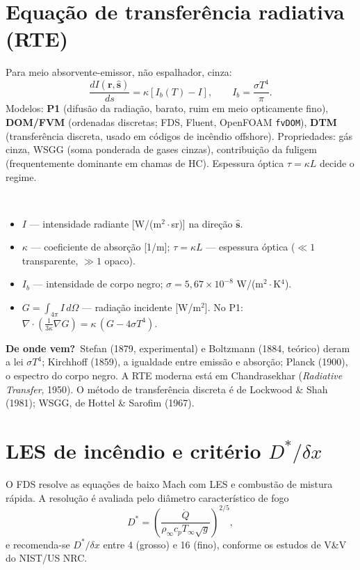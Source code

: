 \documentclass[10pt,a4paper,twocolumn,openany]{report}
\newcommand{\lead}[2]{\par\medskip\noindent{\color{#1}\bfseries #2}\ }
\newenvironment{conceito}[1]{\section{#1}}{\par}
\newenvironment{dicionario}[1][Dicionário da equação]{\lead{azul}{#1.}\small}{\par\medskip}
\newcommand{\origem}{\par\smallskip\noindent\textcolor{azul}{\textbf{De onde vem?}}\ }
\begin{document}
\begin{conceito}{Equação de transferência radiativa (RTE)}
Para meio absorvente-emissor, não espalhador, cinza:
\[
  \frac{dI(\mathbf r,\hat{\mathbf s})}{ds}=\kappa\left[I_b(T)-I\right],\qquad
  I_b=\frac{\sigma T^4}{\pi}.
\]
Modelos: \textbf{P1} (difusão da radiação, barato, ruim em meio opticamente
fino), \textbf{DOM/FVM} (ordenadas discretas; FDS, Fluent, OpenFOAM
\texttt{fvDOM}), \textbf{DTM} (transferência discreta, usado em códigos de
incêndio offshore). Propriedades: gás cinza, WSGG (soma ponderada de gases
cinzas), contribuição da fuligem (frequentemente dominante em chamas de HC).
Espessura óptica $\tau=\kappa L$ decide o regime.
\end{conceito}

\begin{dicionario}[Dicionário da equação: radiação]
\begin{itemize}[leftmargin=*,nosep]
  \item $I$ --- intensidade radiante [W/(m$^2\cdot$sr)] na direção $\hat{\mathbf s}$.
  \item $\kappa$ --- coeficiente de absorção [1/m]; $\tau=\kappa L$ ---
        espessura óptica ($\ll1$ transparente, $\gg1$ opaco).
  \item $I_b$ --- intensidade de corpo negro; $\sigma=5{,}67\times10^{-8}$
        W/(m$^2\cdot$K$^4$).
  \item $G=\int_{4\pi}I\,d\Omega$ --- radiação incidente [W/m$^2$]. No P1:
        $\nabla\cdot\left(\frac{1}{3\kappa}\nabla G\right)=\kappa\,(G-4\sigma T^4)$.
\end{itemize}
\origem Stefan (1879, experimental) e Boltzmann (1884, teórico) deram a lei
$\sigma T^4$; Kirchhoff (1859), a igualdade entre emissão e absorção; Planck
(1900), o espectro do corpo negro. A RTE moderna está em Chandrasekhar
(\emph{Radiative Transfer}, 1950). O método de transferência discreta é de
Lockwood \& Shah (1981); WSGG, de Hottel \& Sarofim (1967).
\end{dicionario}


\begin{conceito}{LES de incêndio e critério $D^*/\delta x$}
O FDS resolve as equações de baixo Mach com LES e combustão de mistura
rápida. A resolução é avaliada pelo diâmetro característico de fogo
\[
  D^*=\left(\frac{\dot Q}{\rho_\infty c_p T_\infty\sqrt g}\right)^{2/5},
\]
e recomenda-se $D^*/\delta x$ entre 4 (grosso) e 16 (fino), conforme os
estudos de V\&V do NIST/US NRC.
\end{conceito}
\end{document}
